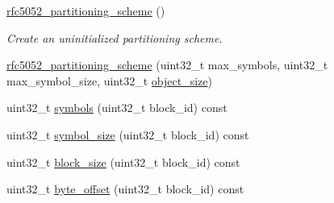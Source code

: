 \begin{DoxyCompactItemize}
\item 
\hypertarget{classkodo_1_1rfc5052__partitioning__scheme_af78177bc60453630e55c7d5ca9887ae6}{\hyperlink{classkodo_1_1rfc5052__partitioning__scheme_af78177bc60453630e55c7d5ca9887ae6}{rfc5052\-\_\-partitioning\-\_\-scheme} ()}\label{classkodo_1_1rfc5052__partitioning__scheme_af78177bc60453630e55c7d5ca9887ae6}

\begin{DoxyCompactList}\small\item\em Create an uninitialized partitioning scheme. \end{DoxyCompactList}\item 
\hyperlink{classkodo_1_1rfc5052__partitioning__scheme_a4aae176907402fc22d41d26860624c51}{rfc5052\-\_\-partitioning\-\_\-scheme} (uint32\-\_\-t max\-\_\-symbols, uint32\-\_\-t max\-\_\-symbol\-\_\-size, uint32\-\_\-t \hyperlink{classkodo_1_1rfc5052__partitioning__scheme_a169472a094a76d65f42079a2207265d4}{object\-\_\-size})
\item 
uint32\-\_\-t \hyperlink{classkodo_1_1rfc5052__partitioning__scheme_a3fda95b3f78a1ec1b40d66f16bad6fdf}{symbols} (uint32\-\_\-t block\-\_\-id) const 
\begin{DoxyCompactList}\small\item\em \end{DoxyCompactList}\item 
uint32\-\_\-t \hyperlink{classkodo_1_1rfc5052__partitioning__scheme_a1ed5a33599a5fe385468a07598f8bc70}{symbol\-\_\-size} (uint32\-\_\-t block\-\_\-id) const 
\begin{DoxyCompactList}\small\item\em \end{DoxyCompactList}\item 
uint32\-\_\-t \hyperlink{classkodo_1_1rfc5052__partitioning__scheme_acdef2d0896a69e6942730f5cbfdd1368}{block\-\_\-size} (uint32\-\_\-t block\-\_\-id) const 
\begin{DoxyCompactList}\small\item\em \end{DoxyCompactList}\item 
uint32\-\_\-t \hyperlink{classkodo_1_1rfc5052__partitioning__scheme_a654ba05491e531a33b3d3a0f0dab31f7}{byte\-\_\-offset} (uint32\-\_\-t block\-\_\-id) const 
\begin{DoxyCompactList}\small\item\em \end{DoxyCompactList}\item 

\end{DoxyCompactItemize}
